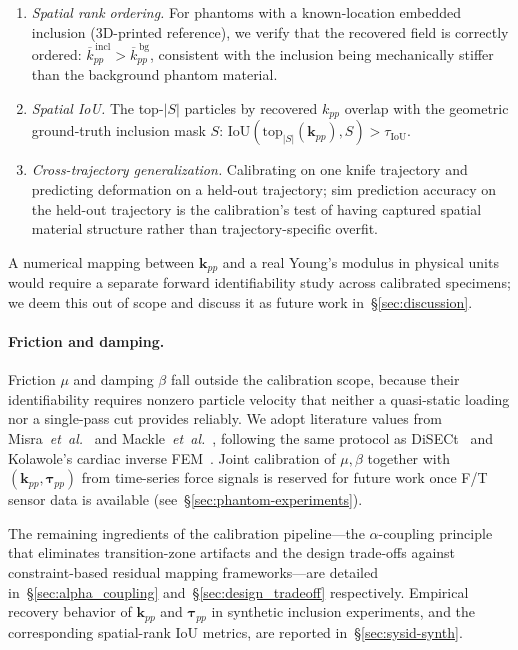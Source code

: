 \documentclass[letterpaper, 10 pt, conference]{ieeeconf}  %
\theoremstyle{tight}
\begin{document}
\begin{enumerate}[label=(\alph*),leftmargin=*,noitemsep,topsep=0.2em]
\item \emph{Spatial rank ordering.} For phantoms with a known-location
  embedded inclusion (3D-printed reference), we verify that the
  recovered field is correctly ordered:
  $\overline{k}_{pp}^{\,\mathrm{incl}} > \overline{k}_{pp}^{\,\mathrm{bg}}$,
  consistent with the inclusion being mechanically stiffer than the
  background phantom material.
\item \emph{Spatial IoU.} The top-$|S|$ particles by recovered $k_{pp}$
  overlap with the geometric ground-truth inclusion mask $S$:
  $\mathrm{IoU}(\mathrm{top}_{|S|}(\mathbf{k}_{pp}), S) > \tau_{\mathrm{IoU}}$.
\item \emph{Cross-trajectory generalization.} Calibrating on one knife
  trajectory and predicting deformation on a held-out trajectory; sim
  prediction accuracy on the held-out trajectory is the calibration's
  test of having captured spatial material structure rather than
  trajectory-specific overfit.
\end{enumerate}

A numerical mapping between $\mathbf{k}_{pp}$ and a real Young's modulus
in physical units would require a separate forward identifiability study
across calibrated specimens; we deem this out of scope and discuss it
as future work in~\S\ref{sec:discussion}.

\paragraph{Friction and damping.}
Friction $\mu$ and damping $\beta$ fall outside the calibration scope,
because their identifiability requires nonzero particle velocity that
neither a quasi-static loading nor a single-pass cut provides reliably.
We adopt literature values from
Misra~\textit{et~al.}~\cite{misra2010} and
Mackle~\textit{et~al.}~\cite{mackle2020}, following the same protocol as
DiSECt~\cite{heiden2021disect} and Kolawole's cardiac inverse
FEM~\cite{kolawole2023}. Joint calibration of $\mu, \beta$ together with
$(\mathbf{k}_{pp},\boldsymbol{\tau}_{pp})$ from time-series force signals
is reserved for future work once F/T sensor data is available
(see~\S\ref{sec:phantom-experiments}).

The remaining ingredients of the calibration pipeline---the
$\alpha$-coupling principle that eliminates transition-zone artifacts
and the design trade-offs against constraint-based residual mapping
frameworks---are detailed in~\S\ref{sec:alpha_coupling}
and~\S\ref{sec:design_tradeoff} respectively. Empirical recovery
behavior of $\mathbf{k}_{pp}$ and $\boldsymbol{\tau}_{pp}$ in synthetic
inclusion experiments, and the corresponding spatial-rank IoU metrics,
are reported in~\S\ref{sec:sysid-synth}.
\end{document}
